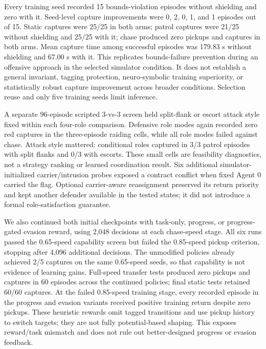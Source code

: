 \documentclass[letterpaper]{article}
\begin{document}
Every training seed recorded 15 bounds-violation episodes without shielding and zero with it. Seed-level capture improvements were 0, 2, 0, 1, and 1 episodes out of 15. Static captures were 25/25 in both arms; patrol captures were 21/25 without shielding and 25/25 with it; chase produced zero pickups and captures in both arms. Mean capture time among successful episodes was 179.83 s without shielding and 67.00 s with it. This replicates bounds-failure prevention during an offensive approach in the selected simulator condition. It does not establish a general invariant, tagging protection, neuro-symbolic training superiority, or statistically robust capture improvement across broader conditions. Selection reuse and only five training seeds limit inference.

A separate 96-episode scripted 3-vs-3 screen held split-flank or escort attack style fixed within each four-role comparison. Defensive role modes again recorded zero red captures in the three-episode raiding cells, while all role modes failed against chase. Attack style mattered: conditional roles captured in 3/3 patrol episodes with split flanks and 0/3 with escorts. These small cells are feasibility diagnostics, not a strategy ranking or learned coordination result. Six additional simulator-initialized carrier/intrusion probes exposed a contract conflict when fixed Agent 0 carried the flag. Optional carrier-aware reassignment preserved its return priority and kept another defender available in the tested states; it did not introduce a formal role-satisfaction guarantee.

We also continued both initial checkpoints with task-only, progress, or progress-gated evasion reward, using 2,048 decisions at each chase-speed stage. All six runs passed the 0.65-speed capability screen but failed the 0.85-speed pickup criterion, stopping after 4,096 additional decisions. The unmodified policies already achieved 2/5 captures on the same 0.65-speed seeds, so that capability is not evidence of learning gains. Full-speed transfer tests produced zero pickups and captures in 60 episodes across the continued policies; final static tests retained 60/60 captures. At the failed 0.85-speed training stage, every recorded episode in the progress and evasion variants received positive training return despite zero pickups. These heuristic rewards omit tagged transitions and use pickup history to switch targets; they are not fully potential-based shaping. This exposes reward/task mismatch and does not rule out better-designed progress or evasion feedback.
\end{document}
